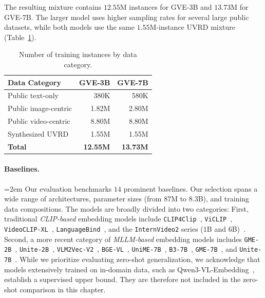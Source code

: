 The resulting mixture contains $12.55$M instances for GVE-3B and $13.73$M for GVE-7B. The larger model uses higher sampling rates for several large public datasets, while both models use the same $1.55$M-instance UVRD mixture (Table~\ref{gve:tab:data_summary}).

\begin{table}[t]
\centering
\caption{Number of training instances by data category.}
\label{gve:tab:data_summary}
\begin{tabular}{@{}lrr@{}}
\toprule
\textbf{Data Category} & \textbf{GVE-3B} & \textbf{GVE-7B} \\
\midrule
Public text-only & 380K & 580K \\
Public image-centric & 1.82M & 2.80M \\
Public video-centric & 8.80M & 8.80M \\
Synthesized UVRD & 1.55M & 1.55M \\
\midrule
\textbf{Total} & \textbf{12.55M} & \textbf{13.73M} \\
\bottomrule
\end{tabular}
\end{table}

\paragraph{Baselines.}
\begingroup\emergencystretch=2em
Our evaluation benchmarks $14$ prominent baselines. Our selection spans a wide range of architectures, parameter sizes (from $87$M to $8.3$B), and training data compositions. The models are broadly divided into two categories:
First, traditional \textit{CLIP-based} embedding models include \texttt{CLIP4Clip}~\cite{luo2022clip4clip}, \texttt{ViCLIP}~\cite{wang2023internvid}, \texttt{VideoCLIP-XL}~\cite{wang2024videoclip}, \texttt{LanguageBind}~\cite{zhu2024languagebind}, and the \texttt{InternVideo2} series ($1$B and $6$B)~\cite{wang2024internvideo2}.
Second, a more recent category of \textit{MLLM-based} embedding models includes \texttt{GME-2B}~\cite{Zhang_2025_CVPR}, \texttt{Unite-2B}~\cite{kong2025modality}, \texttt{VLM2Vec-V2}~\cite{meng2025vlm2vec}, \texttt{BGE-VL}~\cite{zhou2024megapairs}, \texttt{UniME-7B}~\cite{gu2025breaking}, \texttt{B3-7B}~\cite{thirukovalluru2025breaking}, \texttt{GME-7B}~\cite{Zhang_2025_CVPR}, and \texttt{Unite-7B}~\cite{kong2025modality}.
While we prioritize evaluating zero-shot generalization, we acknowledge that models extensively trained on in-domain data, such as Qwen3-VL-Embedding~\cite{qwen3vlembedding}, establish a supervised upper bound. They are therefore not included in the zero-shot comparison in this chapter.
\par\endgroup

